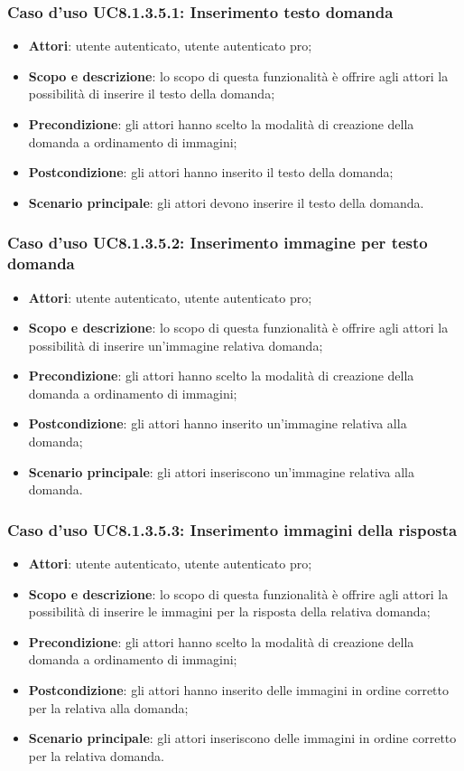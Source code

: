 \subsubsection{Caso d’uso UC8.1.3.5.1: Inserimento testo domanda}
\begin{itemize}
	\item\textbf{Attori}: utente autenticato, utente autenticato pro;
	\item\textbf{Scopo e descrizione}: lo scopo di questa funzionalità è offrire agli attori la possibilità di inserire il testo della domanda;
	\item\textbf{Precondizione}: gli attori hanno scelto la modalità di creazione della domanda a ordinamento di immagini; 
	\item \textbf{Postcondizione}: gli attori hanno inserito il testo della domanda;
	\item\textbf{Scenario principale}: gli attori devono inserire il testo della domanda. 
\end{itemize}

\subsubsection{Caso d’uso UC8.1.3.5.2: Inserimento immagine per testo domanda}
\begin{itemize}
	\item\textbf{Attori}: utente autenticato, utente autenticato pro;
	\item\textbf{Scopo e descrizione}: lo scopo di questa funzionalità è offrire agli attori la possibilità di inserire un'immagine relativa domanda;
	\item\textbf{Precondizione}: gli attori hanno scelto la modalità di creazione della domanda a ordinamento di immagini; 
	\item \textbf{Postcondizione}: gli attori hanno inserito un'immagine relativa alla domanda;
	\item\textbf{Scenario principale}: gli attori inseriscono un'immagine relativa alla domanda. 
\end{itemize}

\subsubsection{Caso d’uso UC8.1.3.5.3: Inserimento immagini della risposta}
\begin{itemize}
	\item\textbf{Attori}: utente autenticato, utente autenticato pro;
	\item\textbf{Scopo e descrizione}: lo scopo di questa funzionalità è offrire agli attori la possibilità di inserire le immagini per la risposta della relativa domanda;
	\item\textbf{Precondizione}: gli attori hanno scelto la modalità di creazione della domanda a ordinamento di immagini; 
	\item \textbf{Postcondizione}: gli attori hanno inserito delle immagini in ordine corretto per la relativa alla domanda;
	\item\textbf{Scenario principale}: gli attori inseriscono delle immagini in ordine corretto per la relativa domanda. 
\end{itemize}